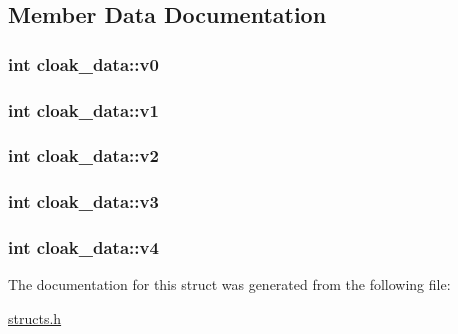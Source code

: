 \subsection{Member Data Documentation}
\hypertarget{structcloak__data_ac03f2d5a6d39bf86536510bf281ab290}{
\subsubsection[{v0}]{\setlength{\rightskip}{0pt plus 5cm}int cloak\-\_\-data\-::v0}}\label{structcloak__data_ac03f2d5a6d39bf86536510bf281ab290}
\hypertarget{structcloak__data_aa14643185983f41355d57b0b9f4f8d46}{
\subsubsection[{v1}]{\setlength{\rightskip}{0pt plus 5cm}int cloak\-\_\-data\-::v1}}\label{structcloak__data_aa14643185983f41355d57b0b9f4f8d46}
\hypertarget{structcloak__data_aa5e54b5d7071e02a581624202be18133}{
\subsubsection[{v2}]{\setlength{\rightskip}{0pt plus 5cm}int cloak\-\_\-data\-::v2}}\label{structcloak__data_aa5e54b5d7071e02a581624202be18133}
\hypertarget{structcloak__data_ac95cd6f056c8c9fb82a8bbc8fae85e99}{
\subsubsection[{v3}]{\setlength{\rightskip}{0pt plus 5cm}int cloak\-\_\-data\-::v3}}\label{structcloak__data_ac95cd6f056c8c9fb82a8bbc8fae85e99}
\hypertarget{structcloak__data_a426344db5e5d372d8f0d70269ed6faad}{
\subsubsection[{v4}]{\setlength{\rightskip}{0pt plus 5cm}int cloak\-\_\-data\-::v4}}\label{structcloak__data_a426344db5e5d372d8f0d70269ed6faad}


The documentation for this struct was generated from the following file\-:\begin{DoxyCompactItemize}
\item 
\hyperlink{structs_8h}{structs.\-h}\end{DoxyCompactItemize}
